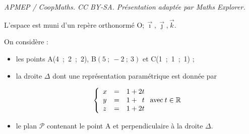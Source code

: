 \documentclass[10pt]{article}
\providecommand{\R}{\mathbb{R}}
\providecommand{\Oijk}{\(\mathrm{O};\vec{\imath},\vec{\jmath},\vec{k}\)}
\begin{document}
\noindent\textit{APMEP / CoopMaths. CC BY-SA. Présentation adaptée par Maths Explorer.}\par\medskip
L'espace est muni d'un repère orthonormé \Oijk.

On considère :

\begin{itemize}[label=$\bullet~$]
\item les points A(4~;~2~;~2), B$(5~;~-2~;~3)$ et C(1~;~1~;~1) ;
\item la droite $\Delta$ dont une représentation paramétrique est donnée par

\[\left\{\begin{array}{lc l}
x	&=& 1 + 2t\\
y 	&=&1+ \phantom{2}t\\
z 	&=& 1 +2t\\
\end{array}\right. \text{avec}\: t \in \R\]

\item le plan $\mathcal{P}$ contenant le point A et perpendiculaire à la droite $\Delta$.
\end{itemize}

\medskip
\end{document}
